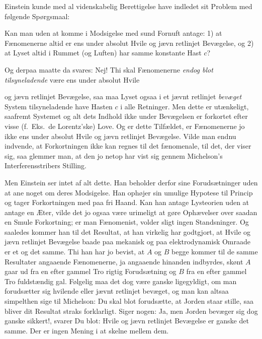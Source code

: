\documentclass[12pt,a4paper]{article}
\newcommand{\opage}[1]{\marginnote{\footnotesize\textit{[#1]}}}
\begin{document}
Einstein kunde med al videnskabelig Berettigelse have indledet sit Problem med
følgende Spørgsmaal:

Kan man uden at komme i Modsigelse med sund Fornuft antage: 1) at Fænomenerne
altid er ens under absolut Hvile og jævn retlinjet Bevægelse, og 2) at Lyset
altid i Rummet (og Luften) har samme konstante Hast $c$?

Og derpaa maatte da svares: Nej! Thi skal Fænomenerne \emph{endog blot
tilsyneladende} være ens under absolut Hvile

\opage{203} og jævn retlinjet Bevægelse, saa maa Lyset ogsaa i et jævnt retlinjet
\emph{bevæget} System tilsyneladende have Hasten $c$ i alle Retninger. Men
dette er utænkeligt, saafremt Systemet og alt dets Indhold ikke under
Bevægelsen er forkortet efter visse (f.\ Eks.\ de Lorentz'ske) Love. Og er
dette Tilfældet, er Fænomenerne jo ikke ens under absolut Hvile og jævn
retlinjet Bevægelse. Vilde man endnu indvende, at Forkortningen ikke kan regnes
til \guillemotright det fænomenale\guillemotleft, til det, der \guillemotright
viser sig\guillemotleft, saa glemmer man, at den jo netop har vist sig gennem
Michelson's Interferensstribers Stilling.

Men Einstein ser intet af alt dette. Han beholder derfor sine Forudsætninger
uden at ane noget om deres Modsigelse. Han ophøjer sin umulige Hypotese til
Princip og tager Forkortningen med paa fri Haand. Kan han antage Lysteorien
uden at antage en Æter, vilde det jo ogsaa være urimeligt at gøre Ophævelser
over saadan en Smule Forkortning; er man Fænomenist, volder sligt ingen
Standsninger. Og saaledes kommer han til det Resultat, at han virkelig har
godtgjort, at Hvile og jævn retlinjet Bevægelse baade paa mekanisk og paa
elektrodynamisk Omraade er et og det samme. Thi han har jo \guillemotright
bevist\guillemotleft, at $A$ og $B$ begge kommer til de samme Resultater
angaaende Fænomenerne, ja angaaende hinanden indbyrdes, skønt $A$ gaar ud fra
en efter gammel Tro rigtig Forudsætning og $B$ fra en efter gammel Tro
fuldstændig gal. Følgelig maa det dog være ganske ligegyldigt, om man
forudsætter sig hvilende eller jævnt retlinjet bevæget, og man kan altsaa
simpelthen sige til Michelson: Du skal blot forudsætte, at Jorden staar stille,
saa bliver dit Resultat straks forklarligt. Siger nogen: Ja, men Jorden bevæger
sig dog ganske sikkert!, svarer Du blot: Hvile og jævn retlinjet Bevægelse er
ganske det samme. Der er ingen Mening i at skelne mellem dem.
\end{document}
